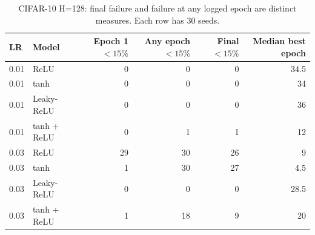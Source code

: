 \begin{table}[htbp]
\centering
\caption{CIFAR-10 H=128: final failure and failure at any logged epoch are distinct measures. Each row has 30 seeds.}
\label{tab:cifaronset}
\footnotesize
\begin{tabular}{@{}llrrrr@{}}
\toprule
LR & Model & Epoch 1 $<15\%$ & Any epoch $<15\%$ & Final $<15\%$ & Median best epoch \\
\midrule
0.01 & ReLU & 0 & 0 & 0 & 34.5 \\
0.01 & tanh & 0 & 0 & 0 & 34 \\
0.01 & Leaky-ReLU & 0 & 0 & 0 & 36 \\
0.01 & tanh + ReLU & 0 & 1 & 1 & 12 \\
0.03 & ReLU & 29 & 30 & 26 & 9 \\
0.03 & tanh & 1 & 30 & 27 & 4.5 \\
0.03 & Leaky-ReLU & 0 & 0 & 0 & 28.5 \\
0.03 & tanh + ReLU & 1 & 18 & 9 & 20 \\
\bottomrule
\end{tabular}
\end{table}
